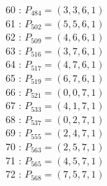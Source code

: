 \documentclass{article}
\begin{document}
{\begin{multicols}{3}
60 : $P_{484}=( 3, 3, 6, 1 )$\\
61 : $P_{502}=( 5, 5, 6, 1 )$\\
62 : $P_{509}=( 4, 6, 6, 1 )$\\
63 : $P_{516}=( 3, 7, 6, 1 )$\\
64 : $P_{517}=( 4, 7, 6, 1 )$\\
65 : $P_{519}=( 6, 7, 6, 1 )$\\
66 : $P_{521}=( 0, 0, 7, 1 )$\\
67 : $P_{533}=( 4, 1, 7, 1 )$\\
68 : $P_{537}=( 0, 2, 7, 1 )$\\
69 : $P_{555}=( 2, 4, 7, 1 )$\\
70 : $P_{563}=( 2, 5, 7, 1 )$\\
71 : $P_{565}=( 4, 5, 7, 1 )$\\
72 : $P_{568}=( 7, 5, 7, 1 )$\\
\end{multicols}


%


%


}%
\end{document}
